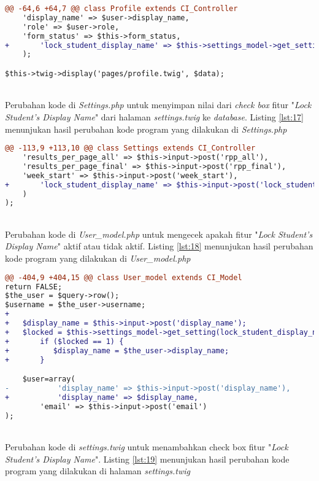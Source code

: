 \begin{lstlisting}[language=diff,caption=Perubahan kode program pada \textit{Profile.php}, label=lst:16, basicstyle=\ttfamily, frame=single,
columns=fullflexible, keepspaces=true, breaklines=true]
@@ -64,6 +64,7 @@ class Profile extends CI_Controller
	'display_name' => $user->display_name,
	'role' => $user->role,
	'form_status' => $this->form_status,
+   	'lock_student_display_name' => $this->settings_model->get_setting(lock_student_display_name),
	);

$this->twig->display('pages/profile.twig', $data);
\end{lstlisting}
~\\
Perubahan  kode di \textit{Settings.php} untuk menyimpan nilai dari \textit{check box} fitur "\textit{Lock Student's Display Name}" dari halaman \textit{settings.twig} ke \textit{database}. Listing \ref{lst:17} menunjukan hasil perubahan kode program yang dilakukan di \textit{Settings.php}

\begin{lstlisting}[language=diff, caption=Perubahan kode program pada \textit{Settings.php}, label=lst:17, basicstyle=\ttfamily, frame=single,
columns=fullflexible, keepspaces=true, breaklines=true]
@@ -113,9 +113,10 @@ class Settings extends CI_Controller
	'results_per_page_all' => $this->input->post('rpp_all'),
	'results_per_page_final' => $this->input->post('rpp_final'),
	'week_start' => $this->input->post('week_start'),
+   	'lock_student_display_name' => $this->input->post('lock_student_display_name')===NULL?0:1,
	)
);
\end{lstlisting}
~\\
Perubahan kode di \textit{User\_model.php} untuk mengecek apakah fitur "\textit{Lock Student's Display Name}" aktif atau tidak aktif. Listing \ref{lst:18} menunjukan hasil perubahan kode program yang dilakukan di \textit{User\_model.php}

\begin{lstlisting}[language=diff, caption=Perubahan kode program pada \textit{User\_model.php}, label=lst:18, basicstyle=\ttfamily, frame=single,
columns=fullflexible, keepspaces=true, breaklines=true]
@@ -404,9 +404,15 @@ class User_model extends CI_Model
return FALSE;
$the_user = $query->row();
$username = $the_user->username;
+
+   $display_name = $this->input->post('display_name');
+   $locked = $this->settings_model->get_setting(lock_student_display_name);
+   	if ($locked == 1) {
+          $display_name = $the_user->display_name;
+       }

	$user=array(
-   		'display_name' => $this->input->post('display_name'),
+      		'display_name' => $display_name,
		'email' => $this->input->post('email')
);
\end{lstlisting}
~\\
Perubahan kode di \textit{settings.twig} untuk menambahkan check box fitur "\textit{Lock Student's Display Name}". Listing \ref{lst:19} menunjukan hasil perubahan kode program yang dilakukan di halaman \textit{settings.twig}

